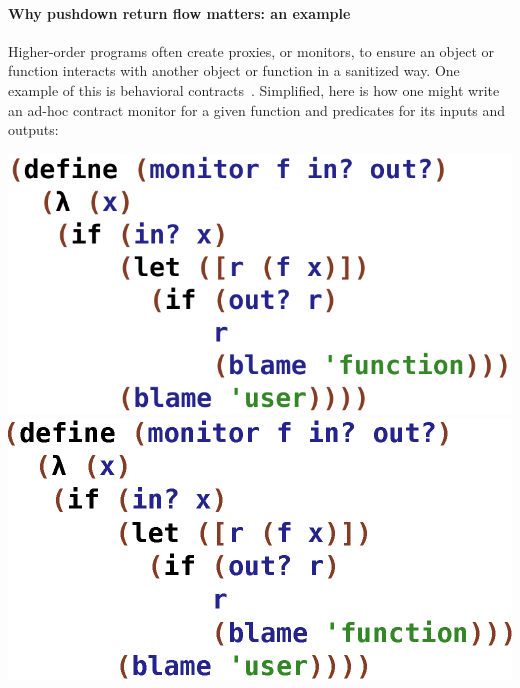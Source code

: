 \paragraph{Why pushdown return flow matters: an example}
Higher-order programs often create proxies, or monitors, to ensure an object or function interacts with another object or function in a sanitized way.
%
One example of this is behavioral contracts~\citep{dvanhorn:Findler2002Contracts}.
%
Simplified, here is how one might write an ad-hoc contract monitor for
a given function and predicates for its inputs and outputs:
 \begin{center}
\ifpdf
  \includegraphics[scale=0.45]{monitor}
\else
  \includegraphics[scale=0.45]{monitor.eps}
\fi
 \end{center}


